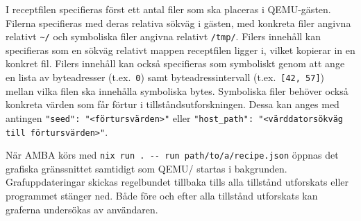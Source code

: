 I receptfilen specifieras först ett antal filer som ska placeras i QEMU-gästen.
Filerna specifieras med deras relativa sökväg i gästen, med konkreta filer
angivna relativt \verb|~/| och symboliska filer angivna relativt \verb|/tmp/|.
Filers innehåll kan specifieras som en sökväg relativt mappen receptfilen ligger
i, vilket kopierar in en konkret fil. Filers innehåll kan också specifieras som
symboliskt genom att ange en lista av byteadresser (t.ex.\ \verb|0|) samt
byteadressintervall (t.ex.\ \verb|[42, 57]|) mellan vilka filen ska innehålla
symboliska bytes. Symboliska filer behöver också konkreta värden som får förtur
i tillståndsutforskningen. Dessa kan anges med antingen
\verb|"seed": "<förtursvärden>"| eller
\verb|"host_path": "<värddatorsökväg till förtursvärden>"|.

När AMBA körs med \lstinline{nix run . -- run path/to/a/recipe.json} öppnas det
grafiska gränssnittet samtidigt som QEMU/\stoe{} startas i bakgrunden.
Grafuppdateringar skickas regelbundet tillbaka tills alla tillstånd utforskats
eller programmet stänger ned. Både före och efter alla tillstånd utforskats kan
graferna undersökas av användaren.
